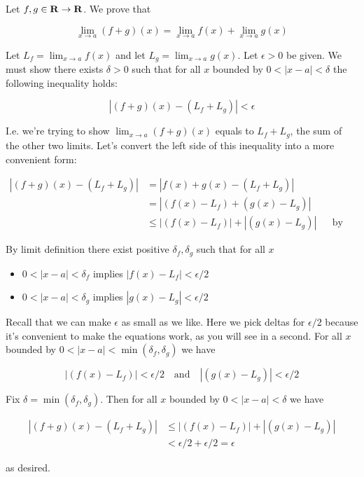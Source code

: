 Let $f,g\in\mathbf{R}\to\mathbf{R}$. We prove that

\[\lim_{x\to a}(f+g)(x)=\lim_{x\to a}f(x)+\lim_{x\to a}g(x)\]

Let $L_f=\lim_{x\to a}f(x)$ and let $L_g=\lim_{x\to a}g(x)$. Let
$\epsilon>0$ be given. We must show there exists $\delta>0$ such that for all
$x$ bounded by $0<|x-a|<\delta$ the following inequality holds:

\begin{equation*}
|(f+g)(x)-(L_f+L_g)|<\epsilon    
\end{equation*}

I.e. we're trying to show $\lim_{x\to a}(f+g)(x)$ equals to $L_f+L_g$,
the sum of the other two limits. Let's convert the left side of this
inequality into a more convenient form:

\begin{align*}
    |(f+g)(x)-(L_f+L_g)|&=|f(x)+g(x)-(L_f+L_g)|\\
    &=|(f(x)-L_f)+(g(x)-L_g)|\\
    &\leq |(f(x)-L_f)|+|(g(x)-L_g)|&&\text{by triangle inequality}
\end{align*}

\vs

By limit definition there exist positive $\delta_f, \delta_g$ such that for all $x$

\begin{itemize}
    \item $0<|x-a|<\delta_f$ implies $|f(x)-L_f|<\epsilon/2$
    \item $0<|x-a|<\delta_g$ implies $|g(x)-L_g|<\epsilon/2$
\end{itemize}

Recall that we can make $\epsilon$ as small as we like. Here we pick deltas
for $\epsilon/2$ because it's convenient to make the equations work, as you
will see in a second. For all $x$ bounded by
$0<|x-a|<\min(\delta_f, \delta_g)$ we have

\[|(f(x)-L_f)|<\epsilon/2 \ \ \ \text{ and }\ \ \  |(g(x)-L_g)|<\epsilon/2\]

Fix $\delta=\min(\delta_f, \delta_g)$. Then for all $x$ bounded by
$0<|x-a|<\delta$ we have

\begin{align*}
    |(f+g)(x)-(L_f+L_g)|&\leq |(f(x)-L_f)|+|(g(x)-L_g)|\\
    &<\epsilon/2+\epsilon/2=\epsilon
\end{align*}

as desired.


